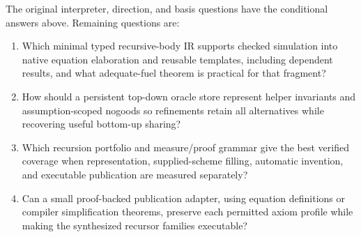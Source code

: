 The original interpreter, direction, and basis questions have the conditional
answers above. Remaining questions are:
\begin{enumerate}[label=R5.N\arabic*.]
\item Which minimal typed recursive-body IR supports checked simulation into
native equation elaboration and reusable templates, including dependent
results, and what adequate-fuel theorem is practical for that fragment?
\item How should a persistent top-down oracle store represent helper invariants
and assumption-scoped nogoods so refinements retain all alternatives while
recovering useful bottom-up sharing?
\item Which recursion portfolio and measure/proof grammar give the best verified
coverage when representation, supplied-scheme filling, automatic invention,
and executable publication are measured separately?
\item Can a small proof-backed publication adapter, using equation definitions
or compiler simplification theorems, preserve each permitted axiom profile
while making the synthesized recursor families executable?
\end{enumerate}
